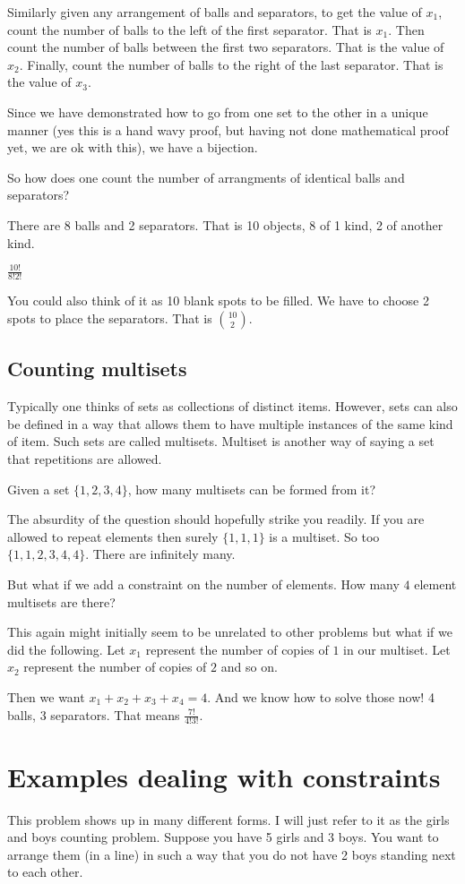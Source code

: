 \documentclass[12pt]{article}
\begin{document}
Similarly given any arrangement of balls and separators, to get the value of $x_1$, count the number of balls to the left of the first separator. That is $x_1$. Then count the number of balls between the first two separators. That is the value of $x_2$. Finally, count the number of balls to the right of the last separator. That is the value of $x_3$.

Since we have demonstrated how to go from one set to the other in a unique manner (yes this is a hand wavy proof, but having not done mathematical proof yet, we are ok with this), we have a bijection.

So how does one count the number of arrangments of identical balls and separators?

There are 8 balls and 2 separators. That is 10 objects, 8 of 1 kind, 2 of another kind.

$\frac{10!}{8!2!}$

You could also think of it as 10 blank spots to be filled. We have to choose 2 spots to place the separators. That is $\binom{10}{2}$.

\subsection*{Counting multisets}
Typically one thinks of sets as collections of distinct items. However, sets can also be defined in a way that allows them to have multiple instances of the same kind of item. Such sets are called multisets. Multiset is another way of saying a set that repetitions  are allowed.

Given a set $\{1,2,3,4\}$, how many multisets can be formed from it?

The absurdity of the question should hopefully strike you readily. If you are allowed to repeat elements then surely $\{1,1,1\}$ is a multiset. So too $\{1,1,2,3,4,4\}$. There are infinitely many.

But what if we add a constraint on the number of elements. How many $4$ element multisets are there?

This again might initially seem to be unrelated to other problems but what if we did the following. Let $x_1$ represent the number of copies of $1$ in our multiset. Let $x_2$ represent the number of copies of $2$ and so on.

Then we want $x_1 + x_2 + x_3 + x_4 = 4$. And we know how to solve those now! 4 balls, 3 separators. That means $\frac{7!}{4!3!}$.

\section*{Examples dealing with constraints}
This problem shows up in many different forms. I will just refer to it as the girls and boys counting problem. Suppose you have 5 girls and 3 boys. You want to arrange them (in a line) in such a way that you do not have 2 boys standing next to each other. 
\end{document}
